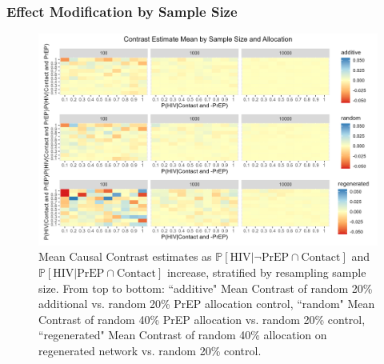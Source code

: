 \documentclass{article}
\theoremstyle{definition}
\begin{document}
\subsubsection{Effect Modification by Sample Size}
\begin{figure}[H]
    \centering
    \includegraphics[width=\linewidth]{Figures/Sample size Mean plots.png}
    \caption{Mean Causal Contrast estimates as $\mathbb{P}\left[\text{HIV} \vert \neg \text{PrEP} \cap \text{Contact}\right]$ and $\mathbb{P}\left[\text{HIV} \vert \text{PrEP} \cap \text{Contact}\right]$ increase, stratified by resampling sample size. From top to bottom: ``additive" Mean Contrast of random 20\% additional vs. random 20\% PrEP allocation control, ``random" Mean Contrast of random 40\% PrEP allocation vs. random 20\% control, ``regenerated" Mean Contrast of random 40\% allocation on regenerated network vs. random 20\% control.}
    \label{fig:Figure 9}
\end{figure}
\end{document}
